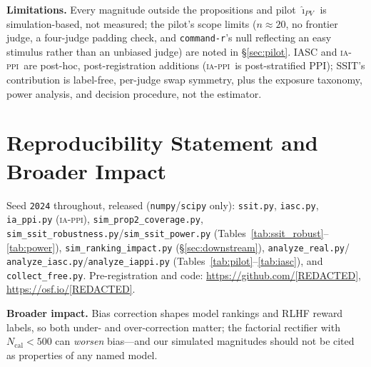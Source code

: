 \documentclass{article}
\newcommand{\Ncal}{N_{\mathrm{cal}}}
\newcommand{\IAPPI}{\textsc{ia-ppi}}
\begin{document}
\textbf{Limitations.} Every magnitude outside the propositions and
pilot $\hat\imath_{PV}$ is simulation-based, not measured; the
pilot's scope limits ($n{\approx}20$, no frontier judge, a
four-judge padding check, and \texttt{command-r}'s null reflecting
an easy stimulus rather than an unbiased judge) are noted in
\S\ref{sec:pilot}. IASC and
\IAPPI\ are post-hoc, post-registration additions (\IAPPI\ is
post-stratified PPI); SSIT's contribution is label-free, per-judge
swap symmetry, plus the exposure taxonomy, power analysis, and
decision procedure, not the estimator.

\section*{Reproducibility Statement and Broader Impact}

Seed \texttt{2024} throughout, released (\texttt{numpy}/\texttt{scipy}
only): \texttt{ssit.py}, \texttt{iasc.py}, \texttt{ia\_ppi.py}
(\IAPPI), \texttt{sim\_prop2\_coverage.py},
\texttt{sim\_ssit\_robustness.py}/\texttt{sim\_ssit\_power.py}
(Tables~\ref{tab:ssit_robust}--\ref{tab:power}),
\texttt{sim\_ranking\_impact.py} (\S\ref{sec:downstream}),
\texttt{analyze\_real.py}/%
\texttt{analyze\_iasc.py}/\texttt{analyze\_iappi.py}
(Tables~\ref{tab:pilot}--\ref{tab:iasc}), and
\texttt{collect\_free.py}. Pre-registration and code:
\url{https://github.com/[REDACTED]}, \url{https://osf.io/[REDACTED]}.

\textbf{Broader impact.} Bias correction shapes model rankings and RLHF reward labels, so
both under- and over-correction matter; the factorial rectifier with
$\Ncal{<}500$ can \emph{worsen} bias---and our simulated magnitudes
should not be cited as properties of any named model.
\end{document}
